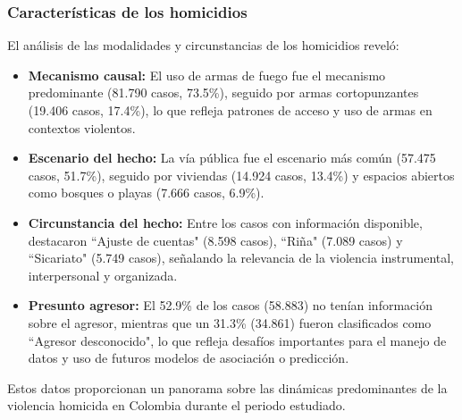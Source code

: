 \documentclass[lettersize,journal]{IEEEtran}
\begin{document}
\subsubsection{Características de los homicidios}
El análisis de las modalidades y circunstancias de los homicidios reveló:
\begin{itemize}
\item \textbf{Mecanismo causal:} El uso de armas de fuego fue el mecanismo predominante (81.790 casos, 73.5\%), seguido por armas cortopunzantes (19.406 casos, 17.4\%), lo que refleja patrones de acceso y uso de armas en contextos violentos.
\item \textbf{Escenario del hecho:} La vía pública fue el escenario más común (57.475 casos, 51.7\%), seguido por viviendas (14.924 casos, 13.4\%) y espacios abiertos como bosques o playas (7.666 casos, 6.9\%).
\item \textbf{Circunstancia del hecho:} Entre los casos con información disponible, destacaron ``Ajuste de cuentas" (8.598 casos), ``Riña" (7.089 casos) y ``Sicariato" (5.749 casos), señalando la relevancia de la violencia instrumental, interpersonal y organizada.
\item \textbf{Presunto agresor:} El 52.9\% de los casos (58.883) no tenían información sobre el agresor, mientras que un 31.3\% (34.861) fueron clasificados como ``Agresor desconocido", lo que refleja desafíos importantes para el manejo de datos y uso de futuros modelos de asociación o predicción.
\end{itemize}
Estos datos proporcionan un panorama sobre las dinámicas predominantes de la violencia homicida en Colombia durante el periodo estudiado.
\end{document}
